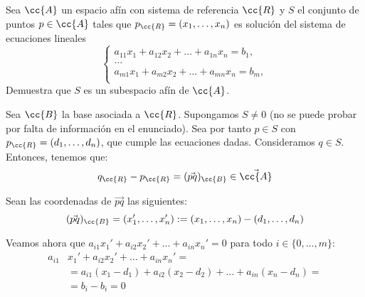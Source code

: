 \begin{ejercicio}
    Sea $\cc{A}$ un espacio afín con sistema de referencia $\cc{R}$ y $S$ el conjunto de puntos $p \in \cc{A}$ tales que $p_\cc{R} = (x_1, \dots, x_n)$ es solución del sistema de ecuaciones lineales
    \begin{equation*}
        \left\{\begin{array}{c}
            a_{11}x_1+a_{12}x_2 + \dots + a_{1n}x_n=b_1, \\
            \dots \\
            a_{m1}x_1+a_{m2}x_2 + \dots + a_{mn}x_n=b_m, \\
        \end{array}\right.
    \end{equation*}
    Demuestra que $S$ es un subespacio afín de $\cc{A}$.

    Sea $\cc{B}$ la base asociada a $\cc{R}$. Supongamos $S\neq 0$ (no se puede probar por falta de información en el enunciado). Sea por tanto $p\in S$ con $p_{\cc{R}}=(d_1,\dots,d_n)$, que cumple las ecuaciones dadas. Consideramos $q\in S$. Entonces, tenemos que: $$q_{\cc{R}}-p_{\cc{R}}=(\vec{pq})_{\cc{B}} \in \vec{\cc{A}}$$
    
    
    Sean las coordenadas de $\vec{pq}$ las siguientes: $$(\vec{pq})_{\cc{B}}=(x'_1,\dots,x'_n):=(x_1,\dots,x_n)-(d_1,\dots,d_n)$$
    
    
    Veamos ahora que  $a_{i1}x_1'+a_{i2}x_2' + \dots + a_{in}x_n'=0$ para todo $i\in \{0,\dots,m\}$:
    \begin{equation*}
        \begin{split}
            a_{i1}&x_1'+a_{i2}x_2' + \dots + a_{in}x_n'=\\
            &= a_{i1}(x_1-d_1)+a_{i2}(x_2-d_2) + \dots + a_{in}(x_n-d_n) =\\
            &= b_i-b_i=0
        \end{split}
    \end{equation*}
    

\end{ejercicio}
